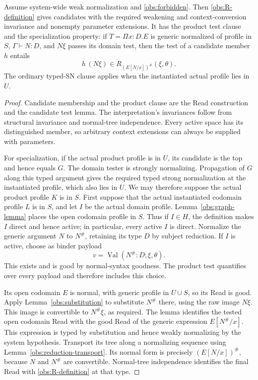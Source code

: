 \begin{proposition}\label{obs:interface-theorem}
Assume system-wide weak normalization and \eqref{obs:forbidden}.
Then \eqref{obs:R-definition} gives candidates with the required
weakening and context-conversion invariance and nonempty parameter
extensions.  It has the product test clause and the specialization
property: if $T=\Pi x:D.E$ is generic normalized of profile in $S$,
$\Gamma\vdash N:D$, and $N\xi$ passes its domain test, then the test
of a candidate member $h$ entails
\[
                   h\,(N\xi)\in R_{(E[N/x])^\#}(\xi,\theta).
\]
The ordinary typed-SN clause applies when the instantiated actual
profile lies in $U$.
\end{proposition}
\begin{proof}
Candidate membership and the product clause are the Read construction
and the candidate test lemma.  The interpretation's invariances follow
from structural invariance and normal-tree independence.  Every active
space has its distinguished member, so arbitrary context extensions
can always be supplied with parameters.

For specialization, if the actual product profile is in $U$, its
candidate is the top and hence equals $G$.  The domain tester is
strongly normalizing.  Propagation of $G$ along this typed argument
gives the required typed strong normalization at the instantiated
profile, which also lies in $U$.  We may therefore suppose the actual
product profile $K$ is in $S$.  First suppose that the actual
instantiated codomain profile $L$ is in $S$, and let $I$ be the actual
domain profile.  Lemma~\ref{obs:graph-lemma} places the open codomain profile in $S$.
Thus if $I\in H$, the definition makes $I$ direct and hence active;
in particular, every active $I$ is direct.  Normalize the generic argument
$N$ to $N^\#$, retaining its type $D$ by subject reduction.  If $I$ is
active, choose as binder payload
\[
                     v=\operatorname{Val}(N^\#:D;\xi,\theta).
\]
This exists and is good by normal-syntax goodness.  The product test
quantifies over every payload and therefore includes this choice.

Its open codomain $E$ is normal, with generic profile in $U\cup S$,
so its Read is good.  Apply Lemma~\ref{obs:substitution} to substitute
$N^\#$ there, using the raw image $N\xi$.  This image is convertible
to $N^\#\xi$, as required.  The lemma identifies the tested open
codomain Read with the good Read of the generic expression
$E[N^\#/x]$.  This expression is typed by substitution and hence
weakly normalizing by the system hypothesis.  Transport its tree along
a normalizing sequence using Lemma~\ref{obs:reduction-transport}.
Its normal form is precisely $(E[N/x])^\#$, because $N$ and $N^\#$
are convertible.  Normal-tree independence identifies the final Read
with \eqref{obs:R-definition} at that type.


\end{proof}
